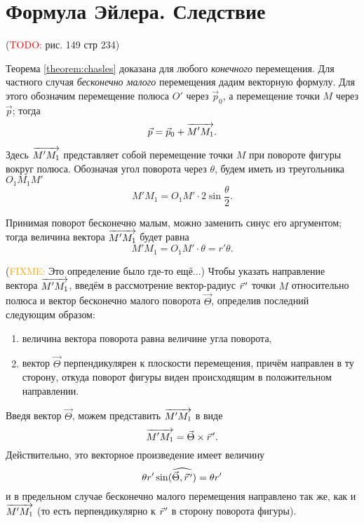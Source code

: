 \section{Формула Эйлера. Следствие}

(\textcolor{red}{TODO:} рис. 149 стр 234)

Теорема \ref{theorem:chasles} доказана для любого \textit{конечного}
перемещения. Для частного случая \textit{бесконечно малого} перемещения дадим
векторную формулу. Для этого обозначим перемещение полюса $O'$ через
$\vec{p}_0$, а перемещение точки $M$ через $\vec{p}$; тогда
\begin{equation}
  \label{eq:flat_figure_movement_temp}
  \vec{p} = \vec{p}_0 + \overrightarrow{M' M_1}.
\end{equation}

Здесь $\overrightarrow{M' M_1}$ представляет собой перемещение точки $M$ при повороте фигуры
вокруг полюса. Обозначая угол поворота через $\theta$, будем иметь из
треугольника $O_1 M_1 M'$
\begin{equation*}
  M' M_1 = O_1 M' \cdot 2 \sin \frac{\theta}{2}.
\end{equation*}

Принимая поворот бесконечно малым, можно заменить синус его аргументом; тогда
величина вектора $\overrightarrow{M' M_1}$ будет равна
\begin{equation*}
  M' M_1 = O_1 M' \cdot \theta = r' \theta.
\end{equation*}

(\textcolor{orange}{FIXME:} Это определение было где-то ещё...)
Чтобы указать направление вектора $\overrightarrow{M' M_1}$, введём в рассмотрение
вектор-радиус $\pvec{r}$ точки $M$ относительно полюса и вектор бесконечно
малого поворота $\vec{\Theta}$, определив последний следующим образом:
\begin{enumerate}
  \item величина вектора поворота равна величине угла поворота,
  \item вектор $\vec{\Theta}$ перпендикулярен к плоскости перемещения, причём
    направлен в ту сторону, откуда поворот фигуры виден происходящим в
    положительном направлении.
\end{enumerate}

Введя вектор $\vec{\Theta}$, можем представить $\overrightarrow{M'M_1}$ в виде
\begin{equation*}
  \vv{M' M_1} = \crossprod{\vec{\Theta}}{\pvec{r}}.
\end{equation*}
Действительно, это векторное произведение имеет величину
\begin{equation*}
  \theta r' \sin(\widehat{\vec{\Theta}, \pvec{r}}) = \theta r'
\end{equation*}
и в предельном случае бесконечно малого перемещения направлено так же, как и
$\overrightarrow{M' M_1}$ (то есть перпендикулярно к $\pvec{r}$ в сторону поворота фигуры).

